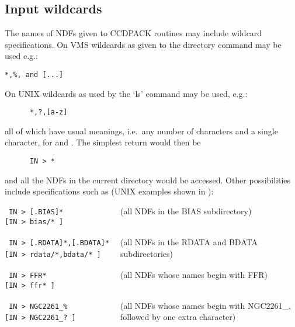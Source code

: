 \subsection{Input wildcards}
The names of NDFs given to CCDPACK routines may include wildcard
specifications. On VMS wildcards as given to the directory command may
be used e.g.:
\begin{myquote}
\begin{verbatim}
*,%, and [...]
\end{verbatim}
\end{myquote}
On UNIX wildcards as used by the `ls' command may be used, e.g.:
\begin{myquote}
\begin{verbatim}
      *,?,[a-z]
\end{verbatim}
\end{myquote}

all of which have usual meanings, i.e.\ any number of characters and a
single character, for \myverb{*,\%} and . The simplest
return
would then be
\begin{myquote}
\begin{verbatim}
      IN > *
\end{verbatim}
\end{myquote}

and all the NDFs in the current directory would be accessed. Other
possibilities include specifications such as (UNIX examples shown in
\myverb{[ ]}):

\begin{myquote}
\verb+ IN > [.BIAS]*             + (all NDFs in the BIAS subdirectory)\\
\verb+[IN > bias/* ]             + \\
\verb+                           + \\
\verb+ IN > [.RDATA]*,[.BDATA]*  + (all NDFs in the RDATA and BDATA \\
\verb+[IN > rdata/*,bdata/* ]    +  subdirectories) \\
\verb+                           + \\
\verb+ IN > FFR*                 + (all NDFs whose names begin with FFR)\\
\verb+[IN > ffr* ]               + \\
\verb+                           + \\
\verb+ IN > NGC2261_%            + (all NDFs whose names begin with NGC2261\_,\\
\verb+[IN > NGC2261_? ]          +  followed by one extra character) 
\end{myquote}

